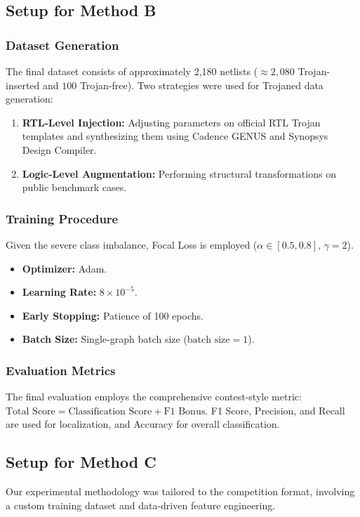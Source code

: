 \documentclass[conference]{IEEEtran}
\begin{document}
\subsection{Setup for Method B}
\subsubsection{Dataset Generation}
The final dataset consists of approximately 2,180 netlists ($\approx 2,080$ Trojan-inserted and $100$ Trojan-free). Two strategies were used for Trojaned data generation:
\begin{enumerate}
    \item \textbf{RTL-Level Injection:} Adjusting parameters on official RTL Trojan templates and synthesizing them using Cadence GENUS and Synopsys Design Compiler.
    \item \textbf{Logic-Level Augmentation:} Performing structural transformations on public benchmark cases.
\end{enumerate}

\subsubsection{Training Procedure}
Given the severe class imbalance, Focal Loss is employed ($\alpha \in [0.5, 0.8]$, $\gamma=2$).
\begin{itemize}
    \item \textbf{Optimizer:} Adam.
    \item \textbf{Learning Rate:} $8 \times 10^{-5}$.
    \item \textbf{Early Stopping:} Patience of 100 epochs.
    \item \textbf{Batch Size:} Single-graph batch size ($\text{batch size}=1$).
\end{itemize}

\subsubsection{Evaluation Metrics}
The final evaluation employs the comprehensive contest-style metric: $\text{Total Score} = \text{Classification Score} + \text{F1 Bonus}$. F1 Score, Precision, and Recall are used for localization, and Accuracy for overall classification.

\subsection{Setup for Method C}
\label{sec:feature_engineering_C} %
Our experimental methodology was tailored to the competition format, involving a custom training dataset and data-driven feature engineering.
\end{document}
